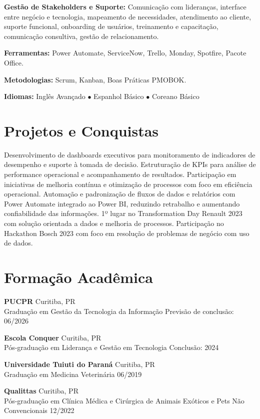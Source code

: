 \documentclass[11pt,a4paper]{article}
\begin{document}
\textbf{Gestão de Stakeholders e Suporte:} Comunicação com lideranças, interface entre negócio e tecnologia, mapeamento de necessidades, atendimento ao cliente, suporte funcional, onboarding de usuários, treinamento e capacitação, comunicação consultiva, gestão de relacionamento.

\textbf{Ferramentas:} Power Automate, ServiceNow, Trello, Monday, Spotfire, Pacote Office.

\textbf{Metodologias:} Scrum, Kanban, Boas Práticas PMOBOK.

\textbf{Idiomas:} Inglês Avançado \quad $\bullet$ \quad Espanhol Básico \quad $\bullet$ \quad Coreano Básico

\section{Projetos e Conquistas}

Desenvolvimento de dashboards executivos para monitoramento de indicadores de desempenho e suporte à tomada de decisão. Estruturação de KPIs para análise de performance operacional e acompanhamento de resultados. Participação em iniciativas de melhoria contínua e otimização de processos com foco em eficiência operacional. Automação e padronização de fluxos de dados e relatórios com Power Automate integrado ao Power BI, reduzindo retrabalho e aumentando confiabilidade das informações. 1º lugar no Transformation Day Renault 2023 com solução orientada a dados e melhoria de processos. Participação no Hackathon Bosch 2023 com foco em resolução de problemas de negócio com uso de dados.

\section{Formação Acadêmica}

\textbf{PUCPR} \hfill Curitiba, PR\\
Graduação em Gestão da Tecnologia da Informação \hfill Previsão de conclusão: 06/2026

\textbf{Escola Conquer} \hfill Curitiba, PR\\
Pós-graduação em Liderança e Gestão em Tecnologia \hfill Conclusão: 2024

\textbf{Universidade Tuiuti do Paraná} \hfill Curitiba, PR\\
Graduação em Medicina Veterinária \hfill 06/2019

\textbf{Qualittas} \hfill Curitiba, PR\\
Pós-graduação em Clínica Médica e Cirúrgica de Animais Exóticos e Pets Não Convencionais \hfill 12/2022
\end{document}
